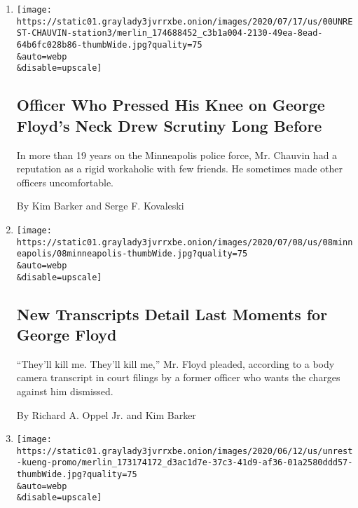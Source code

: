 \begin{enumerate}
\def\labelenumi{\arabic{enumi}.}
\item
  \href{/2020/07/18/us/derek-chauvin-george-floyd.html}{}

  \texttt{[image: https://static01.graylady3jvrrxbe.onion/images/2020/07/17/us/00UNREST-CHAUVIN-station3/merlin\_174688452\_c3b1a004-2130-49ea-8ead-64b6fc028b86-thumbWide.jpg?quality=75\\\&auto=webp\\\&disable=upscale]}

  \hypertarget{officer-who-pressed-his-knee-on-george-floyds-neck-drew-scrutiny-long-before}{%
  \subsection{Officer Who Pressed His Knee on George Floyd's Neck Drew
  Scrutiny Long
  Before}\label{officer-who-pressed-his-knee-on-george-floyds-neck-drew-scrutiny-long-before}}

  In more than 19 years on the Minneapolis police force, Mr. Chauvin had
  a reputation as a rigid workaholic with few friends. He sometimes made
  other officers uncomfortable.

  By Kim Barker and Serge F. Kovaleski
\item
  \href{/2020/07/08/us/george-floyd-body-camera-transcripts.html}{}

  \texttt{[image: https://static01.graylady3jvrrxbe.onion/images/2020/07/08/us/08minneapolis/08minneapolis-thumbWide.jpg?quality=75\\\&auto=webp\\\&disable=upscale]}

  \hypertarget{new-transcripts-detail-last-moments-for-george-floyd}{%
  \subsection{New Transcripts Detail Last Moments for George
  Floyd}\label{new-transcripts-detail-last-moments-for-george-floyd}}

  ``They'll kill me. They'll kill me,'' Mr. Floyd pleaded, according to
  a body camera transcript in court filings by a former officer who
  wants the charges against him dismissed.

  By Richard A. Oppel Jr. and Kim Barker
\item
  \href{/2020/06/27/us/minneapolis-police-officer-kueng.html}{}

  \texttt{[image: https://static01.graylady3jvrrxbe.onion/images/2020/06/12/us/unrest-kueng-promo/merlin\_173174172\_d3ac1d7e-37c3-41d9-af36-01a2580ddd57-thumbWide.jpg?quality=75\\\&auto=webp\\\&disable=upscale]}


\end{enumerate}
